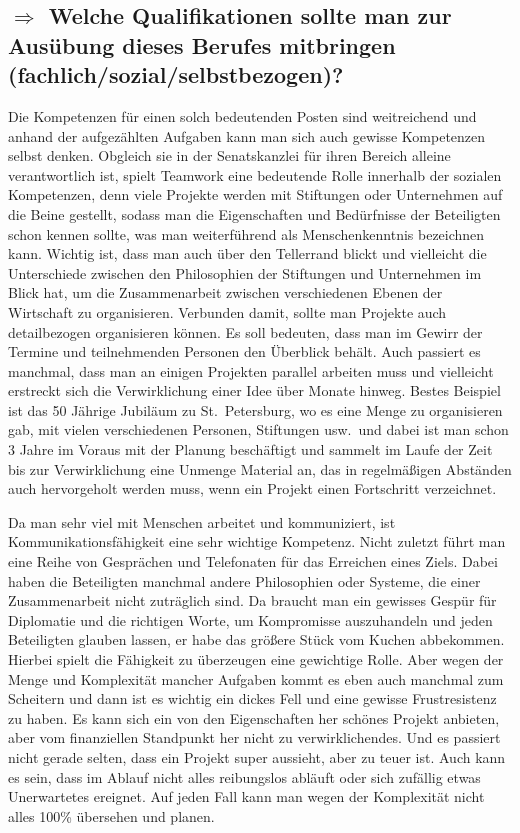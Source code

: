 \documentclass{../../sem_paper}
\newcommand\quest[1]{\subsection*{$\Rightarrow$ #1}}
\begin{document}
\quest{Welche Qualifikationen sollte man zur Ausübung dieses Berufes mitbringen (fachlich/sozial/selbstbezogen)?}
Die Kompetenzen für einen solch bedeutenden Posten sind weitreichend und anhand der aufgezählten Aufgaben kann man sich auch gewisse Kompetenzen selbst denken.
Obgleich sie in der Senatskanzlei für ihren Bereich alleine verantwortlich ist, spielt Teamwork eine bedeutende Rolle innerhalb der sozialen Kompetenzen, denn viele Projekte werden mit Stiftungen oder Unternehmen auf die Beine gestellt, sodass man die Eigenschaften und Bedürfnisse der Beteiligten schon kennen sollte, was man weiterführend als Menschenkenntnis bezeichnen kann. Wichtig ist, dass man auch über den Tellerrand blickt und vielleicht die Unterschiede zwischen den Philosophien der Stiftungen und Unternehmen im Blick hat, um die Zusammenarbeit zwischen verschiedenen Ebenen der Wirtschaft zu organisieren.
Verbunden damit, sollte man Projekte auch detailbezogen organisieren können. Es soll bedeuten, dass man im Gewirr der Termine und teilnehmenden Personen den Überblick behält. Auch passiert es manchmal, dass man an einigen Projekten parallel arbeiten muss und vielleicht erstreckt sich die Verwirklichung einer Idee über Monate hinweg.
Bestes Beispiel ist das 50 Jährige Jubiläum zu St.\ Petersburg, wo es eine Menge zu organisieren gab, mit vielen verschiedenen Personen, Stiftungen usw.\ und dabei ist man schon 3 Jahre im Voraus mit der Planung beschäftigt und sammelt im Laufe der Zeit bis zur Verwirklichung eine Unmenge Material an, das in regelmäßigen Abständen auch hervorgeholt werden muss, wenn ein Projekt einen Fortschritt verzeichnet.

Da man sehr viel mit Menschen arbeitet und kommuniziert, ist Kommunikationsfähigkeit eine sehr wichtige Kompetenz. Nicht zuletzt führt man eine Reihe von Gesprächen und Telefonaten für das Erreichen eines Ziels. Dabei haben die Beteiligten manchmal andere Philosophien oder Systeme, die einer Zusammenarbeit nicht zuträglich sind. Da braucht man ein gewisses Gespür für Diplomatie und die richtigen Worte, um Kompromisse auszuhandeln und jeden Beteiligten glauben lassen, er habe das größere Stück vom Kuchen abbekommen. Hierbei spielt die Fähigkeit zu überzeugen eine gewichtige Rolle.
Aber wegen der Menge und Komplexität mancher Aufgaben kommt es eben auch manchmal zum  Scheitern und dann ist es wichtig ein dickes Fell und eine gewisse Frustresistenz zu haben. Es kann sich ein von den Eigenschaften her schönes Projekt anbieten, aber vom finanziellen Standpunkt her nicht zu verwirklichendes. Und es passiert nicht gerade selten, dass ein Projekt super aussieht, aber zu teuer ist. Auch kann es sein, dass im Ablauf nicht alles reibungslos abläuft oder sich zufällig etwas Unerwartetes ereignet. Auf jeden Fall kann man wegen der Komplexität nicht alles 100\% übersehen und planen.
\end{document}
